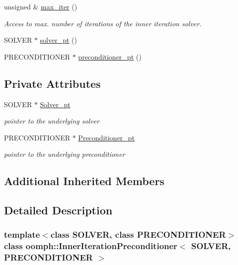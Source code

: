\begin{DoxyCompactItemize}
unsigned \& \hyperlink{classoomph_1_1InnerIterationPreconditioner_a83378e18706d5f0da3b7c23a842a0e15}{max\+\_\+iter} ()
\begin{DoxyCompactList}\small\item\em Access to max. number of iterations of the inner iteration solver. \end{DoxyCompactList}\item 
S\+O\+L\+V\+ER $\ast$ \hyperlink{classoomph_1_1InnerIterationPreconditioner_aa32c5dc72b1384a8f7345e2d37421f43}{solver\+\_\+pt} ()
\item 
P\+R\+E\+C\+O\+N\+D\+I\+T\+I\+O\+N\+ER $\ast$ \hyperlink{classoomph_1_1InnerIterationPreconditioner_ad60bf4f1a13d4cd0120b9adf6fc96d13}{preconditioner\+\_\+pt} ()
\end{DoxyCompactItemize}
\subsection*{Private Attributes}
\begin{DoxyCompactItemize}
\item 
S\+O\+L\+V\+ER $\ast$ \hyperlink{classoomph_1_1InnerIterationPreconditioner_aa90724100b8878bf2ae812b25153e9e6}{Solver\+\_\+pt}
\begin{DoxyCompactList}\small\item\em pointer to the underlying solver \end{DoxyCompactList}\item 
P\+R\+E\+C\+O\+N\+D\+I\+T\+I\+O\+N\+ER $\ast$ \hyperlink{classoomph_1_1InnerIterationPreconditioner_af778d9a0b911a786ba2398d7af8a4c9d}{Preconditioner\+\_\+pt}
\begin{DoxyCompactList}\small\item\em pointer to the underlying preconditioner \end{DoxyCompactList}\end{DoxyCompactItemize}
\subsection*{Additional Inherited Members}


\subsection{Detailed Description}
\subsubsection*{template$<$class S\+O\+L\+V\+ER, class P\+R\+E\+C\+O\+N\+D\+I\+T\+I\+O\+N\+ER$>$\newline
class oomph\+::\+Inner\+Iteration\+Preconditioner$<$ S\+O\+L\+V\+E\+R, P\+R\+E\+C\+O\+N\+D\+I\+T\+I\+O\+N\+E\+R $>$}

